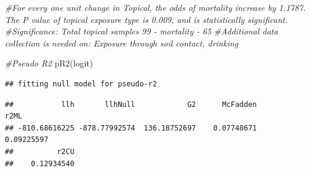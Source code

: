 \documentclass[
  12pt,
]{article}
\newenvironment{Shaded}{\begin{snugshade}}{\end{snugshade}}
\newcommand{\AttributeTok}[1]{\textcolor[rgb]{0.77,0.63,0.00}{#1}}
\newcommand{\CommentTok}[1]{\textcolor[rgb]{0.56,0.35,0.01}{\textit{#1}}}
\newcommand{\DecValTok}[1]{\textcolor[rgb]{0.00,0.00,0.81}{#1}}
\newcommand{\FunctionTok}[1]{\textcolor[rgb]{0.00,0.00,0.00}{#1}}
\newcommand{\NormalTok}[1]{#1}
\newcommand{\OtherTok}[1]{\textcolor[rgb]{0.56,0.35,0.01}{#1}}
\newcommand{\SpecialCharTok}[1]{\textcolor[rgb]{0.00,0.00,0.00}{#1}}
\newcommand{\StringTok}[1]{\textcolor[rgb]{0.31,0.60,0.02}{#1}}
\begin{document}
\begin{Shaded}
\begin{Highlighting}[]
\CommentTok{\#For every one unit change in Topical, the odds of mortality increase by 1.1787. The P value of topical exposure type is 0.009, and is statistically significant.}
\CommentTok{\#Significance: Total topical samples 99 {-} mortality {-} 65}
\CommentTok{\#Additional data collection is needed on: Exposure through soil contact, drinking}

\CommentTok{\#Pseudo R2}
 \FunctionTok{pR2}\NormalTok{(logit)}
\end{Highlighting}
\end{Shaded}

\begin{verbatim}
## fitting null model for pseudo-r2
\end{verbatim}

\begin{verbatim}
##           llh       llhNull            G2      McFadden          r2ML 
## -810.68616225 -878.77992574  136.18752697    0.07748671    0.09225597 
##          r2CU 
##    0.12934540
\end{verbatim}

\begin{Shaded}
\end{Shaded}
\end{document}
